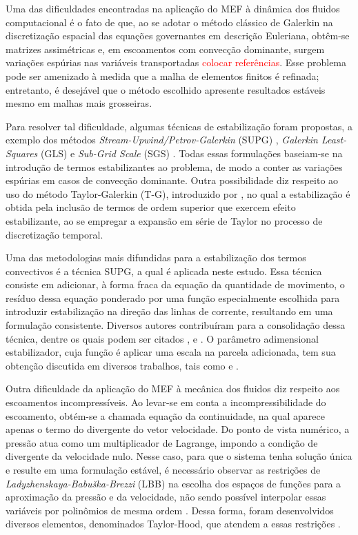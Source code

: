 \documentclass[tese_patricia.tex]{subfiles}
\begin{document}
Uma das dificuldades encontradas na aplicação do MEF à dinâmica dos fluidos computacional é o fato de que, ao se adotar o método clássico de Galerkin na discretização espacial das equações governantes em descrição Euleriana, obtêm-se matrizes assimétricas e, em escoamentos com convecção dominante, surgem variações espúrias nas variáveis transportadas \textcolor{red}{colocar referências}. Esse problema pode ser amenizado à medida que a malha de elementos finitos é refinada; entretanto, é desejável que o método escolhido apresente resultados estáveis mesmo em malhas mais grosseiras.

Para resolver tal dificuldade, algumas técnicas de estabilização foram propostas, a exemplo dos métodos \textit{Stream-Upwind/Petrov-Galerkin} (SUPG) \cite{BrooksH:1982}, \textit{Galerkin Least-Squares} (GLS) \cite{HughesFH:1989} e \textit{Sub-Grid Scale} (SGS) \cite{Hughes:1995}. Todas essas formulações baseiam-se na introdução de termos estabilizantes ao problema, de modo a conter as variações espúrias em casos de convecção dominante. Outra possibilidade diz respeito ao uso do método Taylor-Galerkin (T-G), introduzido por , no qual a estabilização é obtida pela inclusão de termos de ordem superior que exercem efeito estabilizante, ao se empregar a expansão em série de Taylor no processo de discretização temporal.

Uma das metodologias mais difundidas para a estabilização dos termos convectivos é a técnica SUPG, a qual é aplicada neste estudo. Essa técnica consiste em adicionar, à forma fraca da equação da quantidade de movimento, o resíduo dessa equação ponderado por uma função especialmente escolhida para introduzir estabilização na direção das linhas de corrente, resultando em uma formulação consistente. Diversos autores contribuíram para a consolidação dessa técnica, dentre os quais podem ser citados ,  e . O parâmetro adimensional estabilizador, cuja função é aplicar uma escala na parcela adicionada, tem sua obtenção discutida em diversos trabalhos, tais como  e .

Outra dificuldade da aplicação do MEF à mecânica dos fluidos diz respeito aos escoamentos incompressíveis. Ao levar-se em conta a incompressibilidade do escoamento, obtém-se a chamada equação da continuidade, na qual aparece apenas o termo do divergente do vetor velocidade. Do ponto de vista numérico, a pressão atua como um multiplicador de Lagrange, impondo a condição de divergente da velocidade nulo. Nesse caso, para que o sistema tenha solução única e resulte em uma formulação estável, é necessário observar as restrições de \textit{Ladyzhenskaya-Babuška-Brezzi} (LBB) na escolha dos espaços de funções para a aproximação da pressão e da velocidade, não sendo possível interpolar essas variáveis por polinômios de mesma ordem \cite{BrezziF:1991,ZienkiewiczTN:2005,StrangF:2008}. Dessa forma, foram desenvolvidos diversos elementos, denominados Taylor-Hood, que atendem a essas restrições \cite{adicionarReferencias}.
\end{document}
